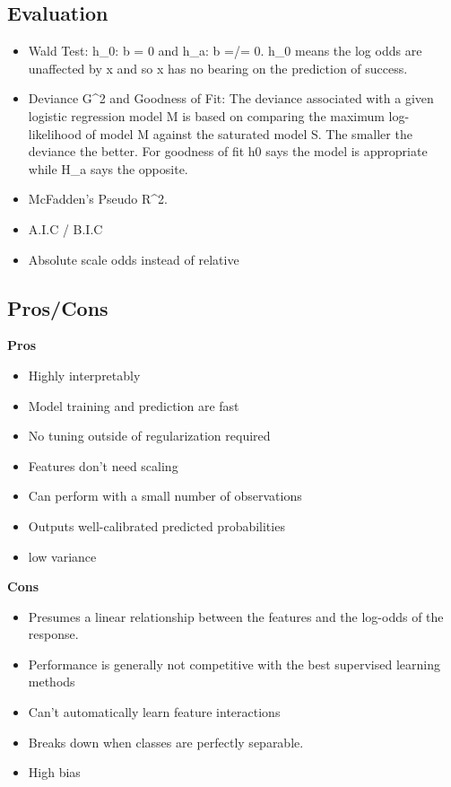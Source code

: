 \documentclass[]{book}
\begin{document}
\subsection{Evaluation}\label{evaluation}

\begin{itemize}
\item
  Wald Test: h\_0: b = 0 and h\_a: b =/= 0. h\_0 means the log odds are
  unaffected by x and so x has no bearing on the prediction of success.
\item
  Deviance G\^{}2 and Goodness of Fit: The deviance associated with a
  given logistic regression model M is based on comparing the maximum
  log-likelihood of model M against the saturated model S. The smaller
  the deviance the better. For goodness of fit h0 says the model is
  appropriate while H\_a says the opposite.
\item
  McFadden's Pseudo R\^{}2.
\item
  A.I.C / B.I.C
\item
  Absolute scale odds instead of relative
\end{itemize}

\subsection{Pros/Cons}\label{proscons-1}

\textbf{Pros}

\begin{itemize}
\item
  Highly interpretably
\item
  Model training and prediction are fast
\item
  No tuning outside of regularization required
\item
  Features don't need scaling
\item
  Can perform with a small number of observations
\item
  Outputs well-calibrated predicted probabilities
\item
  low variance
\end{itemize}

\textbf{Cons}

\begin{itemize}
\item
  Presumes a linear relationship between the features and the log-odds
  of the response.
\item
  Performance is generally not competitive with the best supervised
  learning methods
\item
  Can't automatically learn feature interactions
\item
  Breaks down when classes are perfectly separable.
\item
  High bias
\end{itemize}
\end{document}
